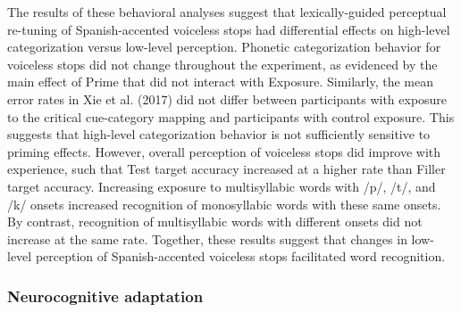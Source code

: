 \documentclass[
  12pt,
  twoside]{article}
\begin{document}
The results of these behavioral analyses suggest that lexically-guided perceptual re-tuning of Spanish-accented voiceless stops had differential effects on high-level categorization versus low-level perception.
Phonetic categorization behavior for voiceless stops did not change throughout the experiment, as evidenced by the main effect of Prime that did not interact with Exposure.
Similarly, the mean error rates in Xie et al. (2017) did not differ between participants with exposure to the critical cue-category mapping and participants with control exposure.
This suggests that high-level categorization behavior is not sufficiently sensitive to priming effects.
However, overall perception of voiceless stops did improve with experience, such that Test target accuracy increased at a higher rate than Filler target accuracy.
Increasing exposure to multisyllabic words with /p/, /t/, and /k/ onsets increased recognition of monosyllabic words with these same onsets.
By contrast, recognition of multisyllabic words with different onsets did not increase at the same rate.
Together, these results suggest that changes in low-level perception of Spanish-accented voiceless stops facilitated word recognition.

\hypertarget{neurocognitive-adaptation}{%
\subsubsection{Neurocognitive adaptation}\label{neurocognitive-adaptation}}
\end{document}
